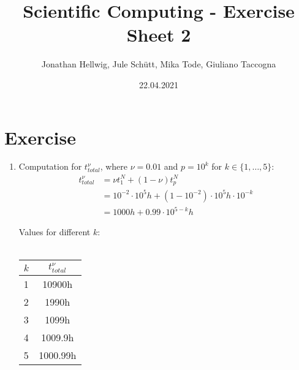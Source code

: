\documentclass{article}
\title{Scientific Computing - Exercise Sheet 2}
\author{Jonathan Hellwig, Jule Schütt, Mika Tode, Giuliano Taccogna}
\date{22.04.2021}
\begin{document}
\maketitle

\section{Exercise}
\begin{enumerate}[label=(\alph*)]
  \item Computation for $t_{total}^\nu$, where $\nu=0.01$ and $p=10^k$ for $k\in\{1,\dots,5\}$:
    \begin{align*}
      t^{\nu}_{total}   &= \nu t_1^N+(1-\nu)t_p^N\\
                        &= 10^{-2} \cdot 10^5h + (1 - 10^{-2}) \cdot 10^5h\cdot 10^{-k} \\
                        &= 1000h + 0.99 \cdot 10^{5-k}h
    \end{align*}
    \begin{center}
      Values for different $k$:\\~\\
      \begin{tabular}{ l | c } 
        $k$ & $t^{\nu}_{total}$ \\
        \hline
        1 & 10900h \\
        2 & 1990h  \\
        3 & 1099h  \\
        4 & 1009.9h  \\
        5 & 1000.99h  \\
      \end{tabular}        
    \end{center}


\end{enumerate}
\end{document}
